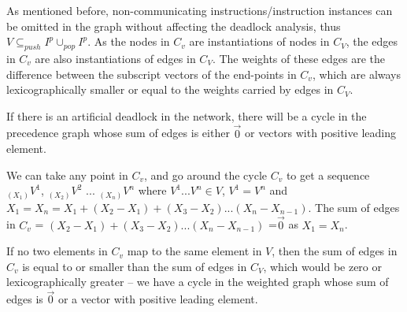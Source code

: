 As mentioned before, non-communicating instructions/instruction instances can be omitted in the graph without affecting the deadlock analysis, thus $V \subseteq _{push}I^p \cup _{pop}I^p$. As the nodes in $C_v$ are instantiations of nodes in $C_V$, the edges in $C_v$ are also
instantiations of edges in $C_V$. The weights of these edges are the difference between
the subscript vectors of the end-points in $C_v$, which are always lexicographically smaller  or equal to the weights carried by edges in $C_V$.


\begin{lemma}
\label{deadlock2cycle}
If there is an artificial deadlock in the network, there will be a cycle in
the precedence graph whose sum of edges
is either $\vec{0}$ or vectors with positive leading element. 
\end{lemma}

We can take any point in  $C_v$, and go around the
cycle $C_v$ to get a sequence $_{(X_1)}V^1$, $_{(X_2)}V^2$ ... $_{(X_n)}V^n$ where $V^1 ... V^n \in V$, $V^1 = V^n$ and $X_1 = X_n = X_1 + (X_2-X_1) + (X_3-X_2) ... (X_n - X_{n-1})$. The sum of edges in $C_v$ = $(X_2-X_1) + (X_3-X_2) ... (X_n - X_{n-1})$ =$\vec{0}$ as $X_1 = X_n$.  

If no two elements in $C_v$ map to the same
element in $V$, then the sum of edges in $C_v$ is equal to or smaller than the 
sum of edges in $C_V$, which would be zero or lexicographically greater -- we have a cycle in the weighted
graph whose sum of edges is $\vec{0}$ or a vector with positive leading element.

